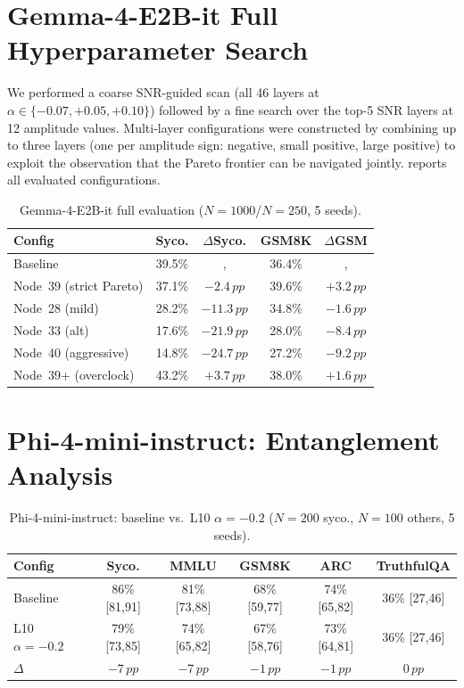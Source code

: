\documentclass{article}
\newcommand{\pp}{\,pp}
\begin{document}
\section{Gemma-4-E2B-it Full Hyperparameter Search}
\label{app:gemma_full}

We performed a coarse SNR-guided scan (all 46 layers at
$\alpha\in\{-0.07,+0.05,+0.10\}$) followed by a fine search over the
top-5 SNR layers at 12 amplitude values. Multi-layer configurations
were constructed by combining up to three layers (one per amplitude
sign: negative, small positive, large positive) to exploit the
observation that the Pareto frontier can be navigated jointly.
 reports all evaluated configurations.

\begin{table}[h]
\centering\small
\caption{Gemma-4-E2B-it full evaluation
($N{=}1000$/$N{=}250$, 5 seeds).}
\label{tab:gemma_full_search}
\begin{tabular}{lcccc}
\toprule
Config & Syco. & $\Delta$Syco. & GSM8K & $\Delta$GSM \\
\midrule
Baseline & 39.5\% & , & 36.4\% & , \\
\rowcolor{pcgreenlt!40}
Node~39 (strict Pareto) & 37.1\% & $-2.4\pp$ & 39.6\% & $+3.2\pp$ \\
Node~28 (mild) & 28.2\% & $-11.3\pp$ & 34.8\% & $-1.6\pp$ \\
Node~33 (alt) & 17.6\% & $-21.9\pp$ & 28.0\% & $-8.4\pp$ \\
Node~40 (aggressive) & 14.8\% & $-24.7\pp$ & 27.2\% & $-9.2\pp$ \\
Node~39+ (overclock) & 43.2\% & $+3.7\pp$ & 38.0\% & $+1.6\pp$ \\
\bottomrule
\end{tabular}
\end{table}

\section{Phi-4-mini-instruct: Entanglement Analysis}
\label{app:phi4}

\begin{table}[h]
\centering\small
\caption{Phi-4-mini-instruct: baseline vs.\ L10 $\alpha=-0.2$
($N{=}200$ syco., $N{=}100$ others, 5 seeds).}
\label{tab:phi4}
\begin{tabular}{lccccc}
\toprule
Config & Syco. & MMLU & GSM8K & ARC & TruthfulQA \\
\midrule
Baseline & 86\% [81,91] & 81\% [73,88] & 68\% [59,77] & 74\% [65,82] & 36\% [27,46] \\
\rowcolor{pclight!18}
L10 $\alpha=-0.2$ & 79\% [73,85] & 74\% [65,82] & 67\% [58,76] & 73\% [64,81] & 36\% [27,46] \\
$\Delta$ & $-7\pp$ & $-7\pp$ & $-1\pp$ & $-1\pp$ & $0\pp$ \\
\bottomrule
\end{tabular}
\end{table}
\end{document}
